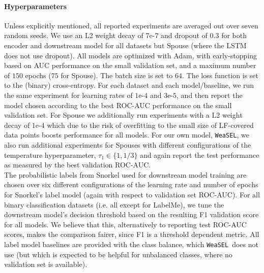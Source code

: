 \documentclass{article}
\newcommand{\weasel}{\texttt{WeaSEL}}\newcommand{\brackets}[1]{\left( #1 \right)}
\begin{document}
\paragraph{Hyperparameters}
Unless explicitly mentioned, all reported experiments are averaged out over seven random seeds.
We use an L2 weight decay of $7\text{e-}7$ and dropout of $0.3$ for both encoder and downstream model for all datasets but Spouse (where the LSTM does not use dropout).
All models are optimized with Adam, with early-stopping based on AUC performance on the small validation set, and a maximum number of $150$ epochs ($75$ for Spouse). The batch size is set to $64$.
The loss function is set to the (binary) cross-entropy.
For each dataset and each model/baseline, we run the same experiment for learning rates of $1\text{e-}4$ and $3\text{e-}5$, and then report the model chosen according to the best ROC-AUC performance on the small validation set. 
For Spouse we additionally run experiments with a L2 weight decay of $1\text{e-}4$ which due to the risk of overfitting to the small size of LF-covered data points boosts performance for all models. 
For our own model, \weasel, we also run additional experiments for Spouses with different configurations of the temperature hyperparameter, $\tau_1 \in \{1, 1/3\}$ and again report the test performance as measured by the best validation ROC-AUC. \\
The probabilistic labels from Snorkel used for downstream model training are chosen over six different configurations of the learning rate and number of epochs for Snorkel's label model (again with respect to validation set ROC-AUC).
For all binary classification datasets (i.e. all except for LabelMe), we tune the downstream model's decision threshold based on the resulting F1 validation score for all models. We believe that this, alternatively to reporting test ROC-AUC scores, makes the comparison fairer, since F1 is a threshold dependent metric.
All label model baselines are provided with the class balance, which \weasel\ does not use (but which is expected to be helpful for unbalanced classes, where no validation set is available).
\end{document}
